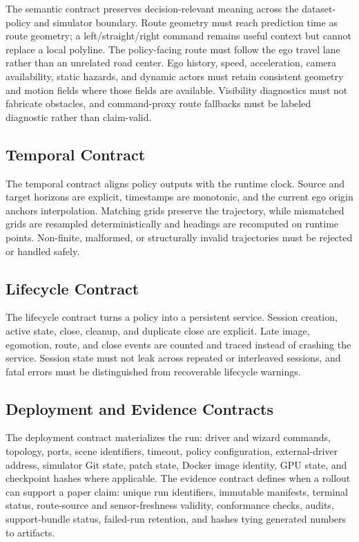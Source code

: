 \documentclass[conference,a4paper]{IEEEtran}
\begin{document}
The semantic contract preserves decision-relevant meaning across the dataset-policy and
simulator boundary. Route geometry must reach prediction time as route geometry; a
left/straight/right command remains useful context but cannot replace a local polyline.
The policy-facing route must follow the ego travel lane rather than an unrelated road
center. Ego history, speed, acceleration, camera availability, static hazards, and
dynamic actors must retain consistent geometry and motion fields where those fields are
available. Visibility diagnostics must not fabricate obstacles, and command-proxy route
fallbacks must be labeled diagnostic rather than claim-valid.

\subsection{Temporal Contract}

The temporal contract aligns policy outputs with the runtime clock. Source and target
horizons are explicit, timestamps are monotonic, and the current ego origin anchors
interpolation. Matching grids preserve the trajectory, while mismatched grids are
resampled deterministically and headings are recomputed on runtime points. Non-finite,
malformed, or structurally invalid trajectories must be rejected or handled safely.

\subsection{Lifecycle Contract}

The lifecycle contract turns a policy into a persistent service. Session creation,
active state, close, cleanup, and duplicate close are explicit. Late image, egomotion,
route, and close events are counted and traced instead of crashing the service. Session
state must not leak across repeated or interleaved sessions, and fatal errors must be
distinguished from recoverable lifecycle warnings.

\subsection{Deployment and Evidence Contracts}

The deployment contract materializes the run: driver and wizard commands, topology,
ports, scene identifiers, timeout, policy configuration, external-driver address,
simulator Git state, patch state, Docker image identity, GPU state, and checkpoint hashes
where applicable. The evidence contract defines when a rollout can support a paper
claim: unique run identifiers, immutable manifests, terminal status, route-source and
sensor-freshness validity, conformance checks, audits, support-bundle status, failed-run
retention, and hashes tying generated numbers to artifacts.
\end{document}
